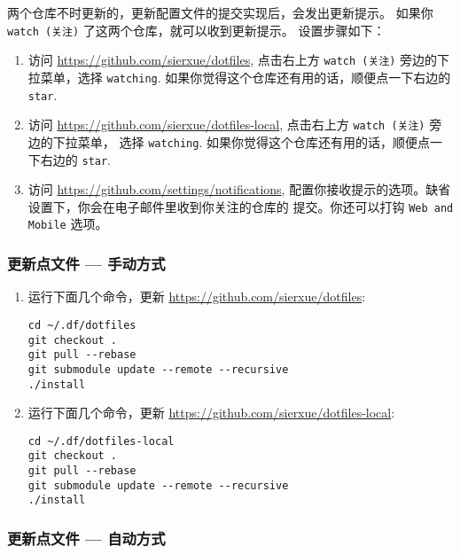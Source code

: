 \documentclass[
    11pt,
    base=hide,
    cite=authoryear,
    device=phone,
    lang=cn,
    mode=simple,
    result=answer,
    toc=onecol,
]{elegantbook_sierxue}
\begin{document}
两个仓库不时更新的，更新配置文件的提交实现后，会发出更新提示。
如果你 \lstinline{watch (关注)} 了这两个仓库，就可以收到更新提示。
设置步骤如下：
\begin{enumerate}
    \item 访问 \href{https://github.com/sierxue/dotfiles}
        {https://github.com/sierxue/dotfiles}, 点击右上方
        \lstinline{watch (关注)} 旁边的下拉菜单，选择 \lstinline{watching}.
        如果你觉得这个仓库还有用的话，顺便点一下右边的 \lstinline{star}.
    \item 访问 \href{https://github.com/sierxue/dotfiles-local}
        {https://github.com/sierxue/dotfiles-local},
        点击右上方 \lstinline{watch (关注)} 旁边的下拉菜单，
        选择 \lstinline{watching}.
        如果你觉得这个仓库还有用的话，顺便点一下右边的 \lstinline{star}.
    \item 访问 \href{https://github.com/settings/notifications}
        {https://github.com/settings/notifications},
        配置你接收提示的选项。缺省设置下，你会在电子邮件里收到你关注的仓库的
        提交。你还可以打钩 \lstinline{Web and Mobile} 选项。
\end{enumerate}

\subsubsection{更新点文件 --- 手动方式}%
\label{ssub:update-dotfiles-manual}

\begin{enumerate}
    \item 运行下面几个命令，更新 \href{https://github.com/sierxue/dotfiles}
        {https://github.com/sierxue/dotfiles}:
\begin{lstlisting}[style=lst]
cd ~/.df/dotfiles
git checkout .
git pull --rebase
git submodule update --remote --recursive
./install
\end{lstlisting}
    \item 运行下面几个命令，更新
        \href{https://github.com/sierxue/dotfiles-local}
        {https://github.com/sierxue/dotfiles-local}:
\begin{lstlisting}[style=lst]
cd ~/.df/dotfiles-local
git checkout .
git pull --rebase
git submodule update --remote --recursive
./install
\end{lstlisting}
\end{enumerate}

\subsubsection{更新点文件 --- 自动方式}%
\label{ssub:update-dotfiles-crontab}
\end{document}

